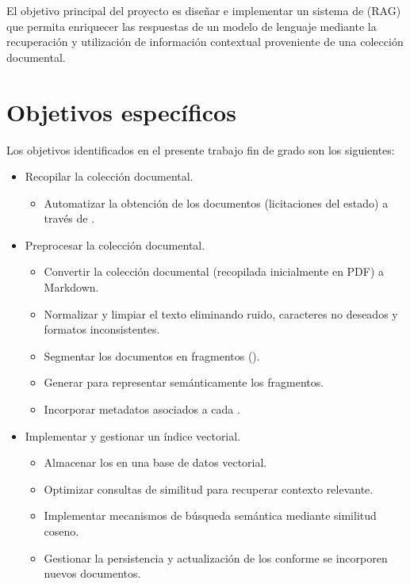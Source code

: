 
El objetivo principal del proyecto es diseñar e implementar un sistema de  (RAG) que permita enriquecer las respuestas de un modelo de lenguaje mediante la recuperación y utilización de información contextual proveniente de una colección documental. 

\section{Objetivos específicos}
Los objetivos identificados en el presente trabajo fin de grado son los siguientes:
\begin{itemize}
\tightlist
	\item Recopilar la colección documental.
	\begin{itemize}
	\tightlist
		\item Automatizar la obtención de los documentos (licitaciones del estado) a través de .
	\end{itemize}
	\item Preprocesar la colección documental.
	\begin{itemize}
	\tightlist 
		\item Convertir la colección documental (recopilada inicialmente en PDF) a Markdown.
		\item Normalizar y limpiar el texto eliminando ruido, caracteres no deseados y formatos inconsistentes.
		\item Segmentar los documentos en fragmentos ().
		\item Generar  para representar semánticamente los fragmentos.
		\item Incorporar metadatos asociados a cada .
	\end{itemize}
	\item Implementar y gestionar un índice vectorial.
	\begin{itemize}
	\tightlist
		\item Almacenar los  en una base de datos vectorial.
		\item Optimizar consultas de similitud para recuperar contexto relevante.
		\item Implementar mecanismos de búsqueda semántica mediante similitud coseno.
		\item Gestionar la persistencia y actualización de los  conforme se incorporen nuevos documentos.
	\end{itemize}

\end{itemize}
